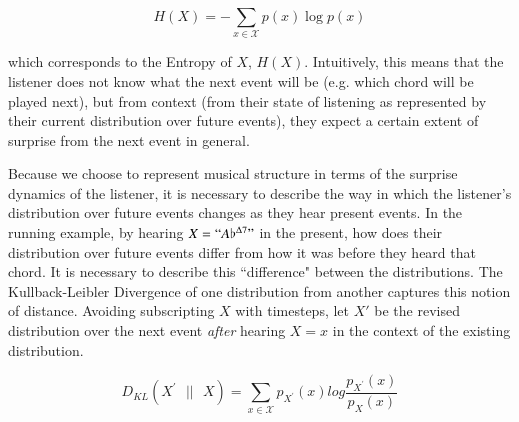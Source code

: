 \documentclass[final,authoryear,5p,times,twocolumn]{elsarticle}
\begin{document}
 $$ H(X) = - \sum_{x \in \mathcal{X}} p(x) \log p(x)$$
 
\noindent which corresponds to the Entropy of $X$, $H(X)$. Intuitively, this means that the listener does not know what the next event will be (e.g. which chord will be played next), but from context (from their state of listening as represented by their current distribution over future events), they expect a certain extent of surprise from the next event in general.

Because we choose to represent musical structure in terms of the surprise dynamics of the listener, it is necessary to describe the way in which the listener's distribution over future events changes as they hear present events. In the running example, by hearing $X=``A\flat^{\Delta7}"$ in the present, how does their distribution over future events differ from how it was before they heard that chord. It is necessary to describe this ``difference" between the distributions. The Kullback-Leibler Divergence of one distribution from another captures this notion of distance. Avoiding subscripting $X$ with timesteps, let  $X'$ be the revised distribution over the next event \textit{after} hearing $X=x$ in the context of the existing distribution.

$$ D_{KL}(X^{\prime}\textrm{ }|| \textrm{ } X) =  \sum_{x \in \mathcal{X}} p_{X^{\prime}}(x) log\frac{p_{X^{\prime}}(x) }{p_{X}(x)}$$
\end{document}
